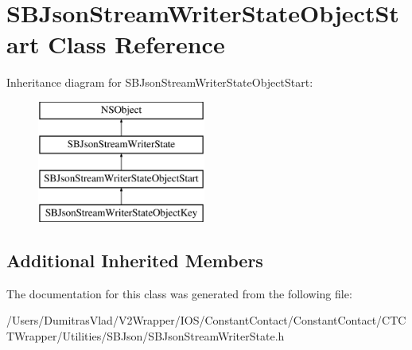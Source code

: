 \hypertarget{interface_s_b_json_stream_writer_state_object_start}{\section{S\-B\-Json\-Stream\-Writer\-State\-Object\-Start Class Reference}
\label{interface_s_b_json_stream_writer_state_object_start}
}
Inheritance diagram for S\-B\-Json\-Stream\-Writer\-State\-Object\-Start\-:\begin{figure}[H]
\begin{center}
\leavevmode
\includegraphics[height=4.000000cm]{interface_s_b_json_stream_writer_state_object_start}
\end{center}
\end{figure}
\subsection*{Additional Inherited Members}


The documentation for this class was generated from the following file\-:\begin{DoxyCompactItemize}
\item 
/\-Users/\-Dumitras\-Vlad/\-V2\-Wrapper/\-I\-O\-S/\-Constant\-Contact/\-Constant\-Contact/\-C\-T\-C\-T\-Wrapper/\-Utilities/\-S\-B\-Json/S\-B\-Json\-Stream\-Writer\-State.\-h\end{DoxyCompactItemize}
